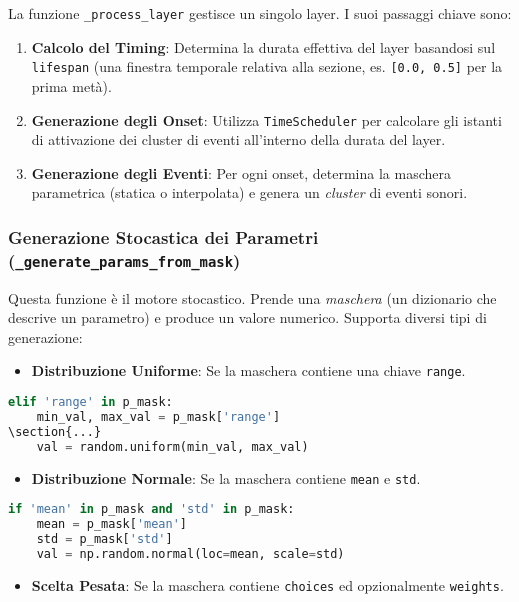 La funzione \texttt{\_process\_layer} gestisce un singolo layer. I suoi passaggi chiave sono:
\begin{enumerate}
    \item \textbf{Calcolo del Timing}: Determina la durata effettiva del layer basandosi sul \texttt{lifespan} (una finestra temporale relativa alla sezione, es. \texttt{[0.0, 0.5]} per la prima metà).
    \item \textbf{Generazione degli Onset}: Utilizza \texttt{TimeScheduler} per calcolare gli istanti di attivazione dei cluster di eventi all'interno della durata del layer.
    \item \textbf{Generazione degli Eventi}: Per ogni onset, determina la maschera parametrica (statica o interpolata) e genera un \textit{cluster} di eventi sonori.
\end{enumerate}
\subsubsection{Generazione Stocastica dei Parametri (\texttt{\_generate\_params\_from\_mask})}
Questa funzione è il motore stocastico. Prende una \textit{maschera} (un dizionario che descrive un parametro) e produce un valore numerico. Supporta diversi tipi di generazione:

\begin{itemize}
    \item \textbf{Distribuzione Uniforme}: Se la maschera contiene una chiave \texttt{range}.
\end{itemize}

\begin{lstlisting}[language=Python]
elif 'range' in p_mask:
    min_val, max_val = p_mask['range']
\section{...}
    val = random.uniform(min_val, max_val)
\end{lstlisting}
\begin{itemize}
    \item \textbf{Distribuzione Normale}: Se la maschera contiene \texttt{mean} e \texttt{std}.
\end{itemize}

\begin{lstlisting}[language=Python]
if 'mean' in p_mask and 'std' in p_mask:
    mean = p_mask['mean']
    std = p_mask['std']
    val = np.random.normal(loc=mean, scale=std)
\end{lstlisting}
\begin{itemize}
    \item \textbf{Scelta Pesata}: Se la maschera contiene \texttt{choices} ed opzionalmente \texttt{weights}.
\end{itemize}

